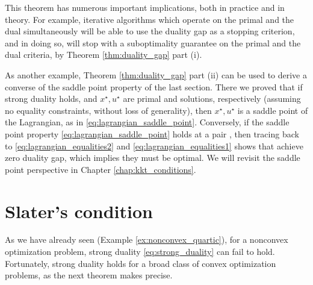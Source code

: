 This theorem has numerous important implications, both in practice and in 
theory. For example, iterative algorithms which operate on the primal and the
dual simultaneously will be able to use the duality gap as a stopping criterion, 
and in doing so, will stop with a suboptimality guarantee on the primal and the 
dual criteria, by Theorem \ref{thm:duality_gap} part (i).  

As another example, Theorem \ref{thm:duality_gap} part (ii) can be used to
derive a converse of the saddle point property of the last section. There we
proved that if strong duality holds, and $x^\star,u^\star$ are primal and 
solutions, respectively (assuming no equality constraints, without loss of
generality), then $x^\star, u^\star$ is a saddle point of the Lagrangian, as in
\eqref{eq:lagrangian_saddle_point}. Conversely, if the saddle point property 
\eqref{eq:lagrangian_saddle_point} holds at a pair ,
then tracing back to \eqref{eq:lagrangian_equalities2} and
\eqref{eq:lagrangian_equalities1} shows that  achieve
zero duality gap, which implies they must be optimal. We will revisit the saddle
point perspective in Chapter \ref{chap:kkt_conditions}.   
 
\section{Slater's condition}
\label{sec:slater_condition}

As we have already seen (Example \ref{ex:nonconvex_quartic}), for a nonconvex 
optimization problem, strong duality \eqref{eq:strong_duality} can fail to
hold. Fortunately, strong duality holds for a broad class of convex optimization
problems, as the next theorem makes precise.  

